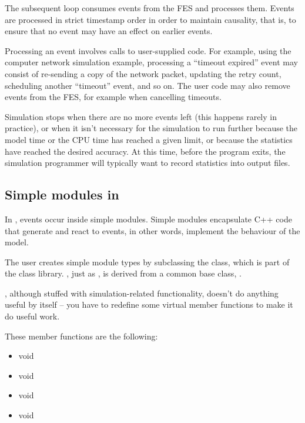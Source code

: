 The subsequent loop consumes events from the FES and processes
them. Events are processed in strict timestamp order in order
to maintain causality, that is, to ensure that no event may have
an effect on earlier events.

Processing an event involves calls to user-supplied code. For example,
using the computer network simulation example, processing a ``timeout
expired'' event may consist of re-sending a copy of the network
packet, updating the retry count, scheduling another ``timeout''
event, and so on. The user code may also remove events from the FES,
for example when cancelling timeouts.

Simulation stops when there are no more events left (this happens
rarely in practice), or when it isn't necessary for the simulation
to run further because the model time or the CPU time has reached
a given limit, or because the statistics have reached the desired
accuracy. At this time, before the program exits, the simulation
programmer will typically want to record statistics into output
files.



\subsection{Simple modules in {\opp}}

In {\opp}, events occur inside simple modules.
Simple modules encapsulate C++ code that generate and react to events,
in other words, implement the behaviour of the model.

The user creates simple module types by subclassing the 
class, which is part of the {\opp} class library.
, just as , is derived
from a common base class, .

, although stuffed with simulation-related
functionality, doesn't do anything useful by itself -- you have
to redefine some virtual member functions to make it do useful work.


These member functions are the following:
\begin{itemize}
  \item{void }
  \item{void }
  \item{void }
  \item{void }
\end{itemize}

